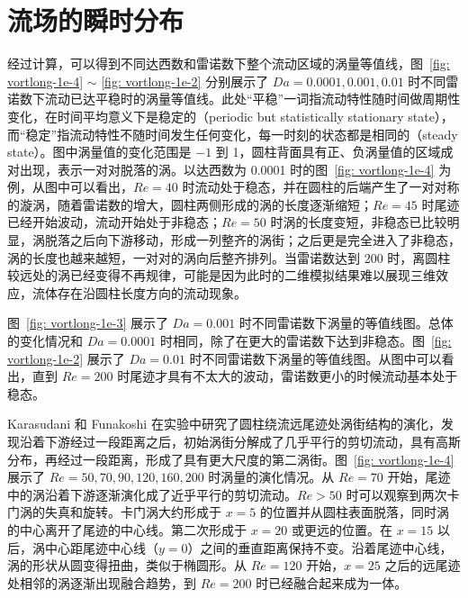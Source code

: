 \section{流场的瞬时分布}\label{sec: transient}

经过计算，可以得到不同达西数和雷诺数下整个流动区域的涡量等值线，图~\ref{fig: vortlong-1e-4} $\sim$ \ref{fig: vortlong-1e-2} 分别展示了 $Da=0.0001,0.001,0.01$ 时不同雷诺数下流动已达平稳时的涡量等值线。此处“平稳”一词指流动特性随时间做周期性变化，在时间平均意义下是稳定的（periodic but statistically stationary state），而“稳定”指流动特性不随时间发生任何变化，每一时刻的状态都是相同的（steady state）。图中涡量值的变化范围是 $-1$ 到 1，圆柱背面具有正、负涡量值的区域成对出现，表示一对对脱落的涡。以达西数为 0.0001 时的图~\ref{fig: vortlong-1e-4} 为例，从图中可以看出，$Re=40$ 时流动处于稳态，并在圆柱的后端产生了一对对称的漩涡，随着雷诺数的增大，圆柱两侧形成的涡的长度逐渐缩短；$Re=45$ 时尾迹已经开始波动，流动开始处于非稳态；$Re=50$ 时涡的长度变短，非稳态已比较明显，涡脱落之后向下游移动，形成一列整齐的涡街；之后更是完全进入了非稳态，涡的长度也越来越短，一对对的涡向后整齐排列。当雷诺数达到 200 时，离圆柱较远处的涡已经变得不再规律，可能是因为此时的二维模拟结果难以展现三维效应，流体存在沿圆柱长度方向的流动现象。

图~\ref{fig: vortlong-1e-3} 展示了 $Da=0.001$ 时不同雷诺数下涡量的等值线图。总体的变化情况和 $Da=0.0001$ 时相同，除了在更大的雷诺数下达到非稳态。图~\ref{fig: vortlong-1e-2} 展示了 $Da=0.01$ 时不同雷诺数下涡量的等值线图。从图中可以看出，直到 $Re=200$ 时尾迹才具有不太大的波动，雷诺数更小的时候流动基本处于稳态。

Karasudani 和 Funakoshi\cite{Karasudani1994} 在实验中研究了圆柱绕流远尾迹处涡街结构的演化，发现沿着下游经过一段距离之后，初始涡街分解成了几乎平行的剪切流动，具有高斯分布，再经过一段距离，形成了具有更大尺度的第二涡街。图~\ref{fig: vortlong-1e-4} 展示了 $Re=50,70,90,120,160,200$ 时涡量的演化情况。从 $Re=70$ 开始，尾迹中的涡沿着下游逐渐演化成了近乎平行的剪切流动。$Re>50$ 时可以观察到两次卡门涡的失真和旋转。卡门涡大约形成于 $x=5$ 的位置并从圆柱表面脱落，同时涡的中心离开了尾迹的中心线。第二次形成于 $x=20$ 或更远的位置。在 $x=15$ 以后，涡中心距尾迹中心线（$y=0$）之间的垂直距离保持不变。沿着尾迹中心线，涡的形状从圆变得扭曲，类似于椭圆形。从 $Re=120$ 开始，$x=25$ 之后的远尾迹处相邻的涡逐渐出现融合趋势，到 $Re=200$ 时已经融合起来成为一体。%

